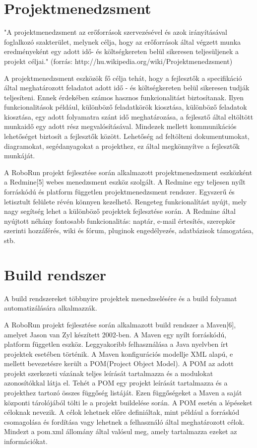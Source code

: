 \section{Projektmenedzsment}

"A projektmenedzsment az erőforrások szervezésével és azok irányításával foglalkozó szakterület, melynek célja, hogy az erőforrások által végzett munka eredményeként egy adott idő- és költségkereten belül sikeresen teljesüljenek a projekt céljai." (forrás: http://hu.wikipedia.org/wiki/Projektmenedzsment)

	A projektmenedzsment eszközök fő célja tehát, hogy a fejlesztők a specifikáció által meghatározott feladatot adott idő - és költségkereten belül sikeresen tudják teljesíteni. Ennek érdekében számos hasznos funkcionalitást biztosítanak. Ilyen funkcionalitások például, különböző feladatkörök kiosztása, különböző feladatok kiosztása, egy adott folyamatra szánt idő meghatározása, a fejlesztő által eltöltött munkaidő egy adott rész megvalósításával. Mindezek mellett kommunikációs lehetőséget biztosít a fejlesztők között. Lehetőség ad feltölteni dokumentumokat, diagramokat, segédanyagokat a projekthez, ez által megkönnyítve a fejlesztők munkáját. 
	
	A RoboRun projekt fejlesztése során alkalmazott projektmenedzsment eszközként a Redmine[5] webes menedzsment eszköz szolgált. A Redmine egy teljesen  nyílt forráskódú és platform független projektmenedzsment rendszer. Egyszerű és letisztult felülete révén könnyen kezelhető. Rengeteg funkcionalítást nyújt, mely nagy segítség lehet a különböző projektek fejlesztése során. A  Redmine által nyújtott néhány fontosabb funkcionalitás: naptár, e-mail értesítés, szerepkör szerinti hozzáférés, wiki és fórum, pluginok engedélyezés, adatbázisok támogatása, stb.



\section{Build rendszer}

A build rendszereket többnyire projektek menedzselésére és a build folyamat automatizálására alkalmazzák. 

	A RoboRun projekt fejlesztése során alkalmazott build rendszer a Maven[6], amelyet Jason van Zyl készített 2002-ben. A Maven egy nyílt forráskódú, platform független eszköz. Leggyakoribb felhasználása a Java nyelvben írt projektek esetében történik. A Maven konfigurációs modellje XML alapú, e mellett bevezetésre került a POM(Project Object Model). A POM az adott projekt szerkezeti vázának teljes leírását tartalmazza és a modulokat azonosítókkal látja el. Tehét a POM egy projekt leírását tartalmazza és a projekthez tartozó összes függőség listáját. Ezen függőségeket a Maven a saját központi tárolójából tölti le a projekt buildelése során. A POM esetén a lépéseket céloknak nevezik. A célok lehetnek előre definiáltak, mint például a forráskód csomagolása és fordítása vagy lehetnek a felhasználó által meghatározott célok.  Mindezt a pom.xml állomány által valósul meg, amely tartalmazza ezeket az információkat. 
	
